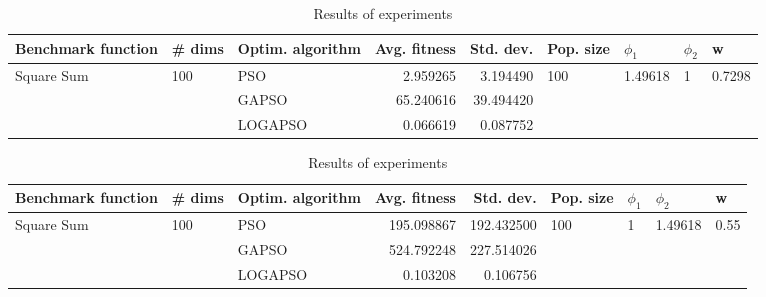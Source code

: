 \documentclass{article}
\begin{document}
\begin{table}
\centering
\caption{Results of experiments}
\begin{tabular}{lllrrllll}
\toprule
         Benchmark function &              \# dims & Optim. algorithm &  Avg. fitness &  Std. dev. &            Pop. size &               $\phi_{1}$ &         $\phi_{2}$ &                       w \\
\midrule
\multirow{3}{*}{Square Sum} & \multirow{3}{*}{100} &              PSO &      2.959265 &   3.194490 & \multirow{3}{*}{100} & \multirow{3}{*}{1.49618} & \multirow{3}{*}{1} & \multirow{3}{*}{0.7298} \\
                            &                      &            GAPSO &     65.240616 &  39.494420 &                      &                          &                    &                         \\
                            &                      &          LOGAPSO &      0.066619 &   0.087752 &                      &                          &                    &                         \\
\bottomrule
\end{tabular}
\end{table}
\begin{table}
\centering
\caption{Results of experiments}
\begin{tabular}{lllrrllll}
\toprule
         Benchmark function &              \# dims & Optim. algorithm &  Avg. fitness &  Std. dev. &            Pop. size &         $\phi_{1}$ &               $\phi_{2}$ &                     w \\
\midrule
\multirow{3}{*}{Square Sum} & \multirow{3}{*}{100} &              PSO &    195.098867 & 192.432500 & \multirow{3}{*}{100} & \multirow{3}{*}{1} & \multirow{3}{*}{1.49618} & \multirow{3}{*}{0.55} \\
                            &                      &            GAPSO &    524.792248 & 227.514026 &                      &                    &                          &                       \\
                            &                      &          LOGAPSO &      0.103208 &   0.106756 &                      &                    &                          &                       \\
\bottomrule
\end{tabular}
\end{table}
\end{document}
